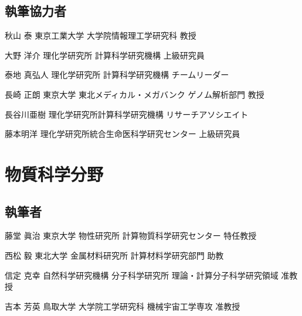 \begin{執筆者一覧}
\subsection{執筆協力者}
\item
{秋山 泰}
{東京工業大学 大学院情報理工学研究科}
{教授}
\item
{大野 洋介}
{理化学研究所 計算科学研究機構}
{上級研究員}
\item
{泰地 真弘人}
{理化学研究所 計算科学研究機構}
{チームリーダー}
\item
{長崎 正朗}
{東京大学 東北メディカル・メガバンク ゲノム解析部門}
{教授}
\item
{長谷川亜樹}
{理化学研究所計算科学研究機構}
{リサーチアソシエイト}
\item
{藤本明洋}
{理化学研究所統合生命医科学研究センター}
{上級研究員}
\section{物質科学分野}
\subsection{執筆者}
\item
{藤堂 眞治}
{東京大学 物性研究所 計算物質科学研究センター}
{特任教授}
\item
{西松 毅}
{東北大学 金属材料研究所 計算材料学研究部門}
{助教}
\item
{信定 克幸}
{自然科学研究機構 分子科学研究所 理論・計算分子科学研究領域}
{准教授}
\item
{吉本 芳英}
{鳥取大学 大学院工学研究科 機械宇宙工学専攻}
{准教授}

\end{執筆者一覧}
